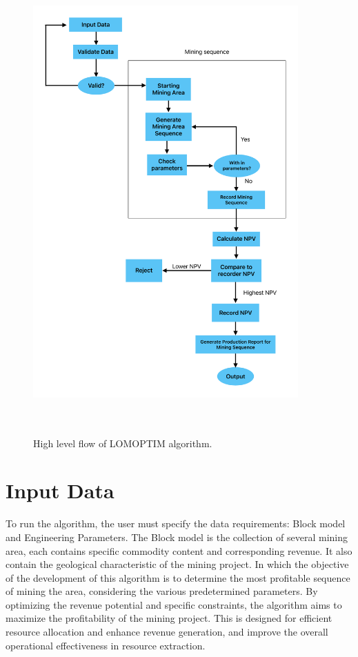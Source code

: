 \documentclass[12pt]{report}
\begin{document}
\begin{figure}[p]
    \centering
    \includegraphics[width=4in,height=7in]{img/PFLomoptim.pdf}
    \caption{High level flow of LOMOPTIM algorithm.}
    \label{fig:PFLomoptim}
\end{figure}

\section{Input Data}

To run the algorithm, the user must specify the data requirements: Block model and Engineering Parameters.
The Block model is the collection of several mining area, each contains specific commodity content and corresponding revenue. 
It also contain the geological characteristic of the mining project. In which the objective of the development of this algorithm is to determine the most profitable sequence of mining the area, considering the various predetermined parameters. By optimizing the revenue potential and specific constraints, the algorithm aims to maximize the profitability of the mining project. 
This is designed for efficient resource allocation and enhance revenue generation, and improve the overall operational effectiveness in resource extraction.
\end{document}
